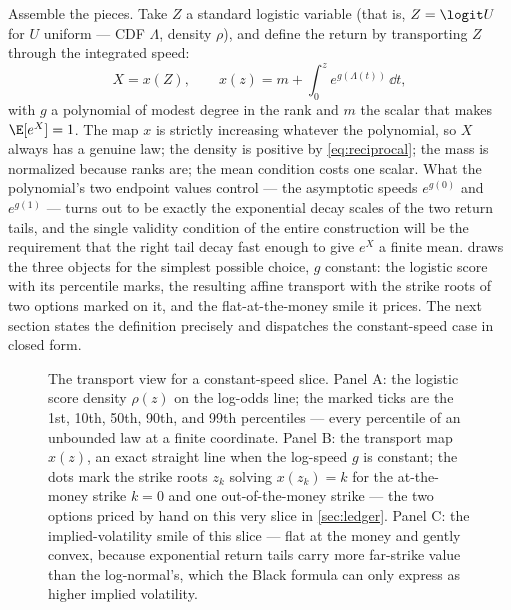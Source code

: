 Assemble the pieces.  Take $Z$ a standard logistic variable (that is,
$Z=\logit U$ for $U$ uniform --- CDF $\Lambda$, density $\rho$), and define
the return by transporting $Z$ through the integrated speed:
\begin{equation}
X=x(Z),
\qquad
x(z)=m+\int_0^{z}e^{g(\Lambda(t))}\,\dd t ,
\label{eq:transport_heur}
\end{equation}
with $g$ a polynomial of modest degree in the rank and $m$ the scalar that
makes $\E[e^{X}]=1$.  The map $x$ is strictly increasing whatever the
polynomial, so $X$ always has a genuine law; the density is positive by
\eqref{eq:reciprocal}; the mass is normalized because ranks are; the mean
condition costs one scalar.  What the polynomial's two endpoint values
control --- the asymptotic speeds $e^{g(0)}$ and $e^{g(1)}$ --- turns out
to be exactly the exponential decay scales of the two return tails, and the
single validity condition of the entire construction will be the
requirement that the right tail decay fast enough to give $e^{X}$ a finite
mean.   draws the three objects for the simplest
possible choice, $g$ constant: the logistic score with its percentile
marks, the resulting affine transport with the strike roots of two options
marked on it, and the flat-at-the-money smile it prices.  The next section
states the definition precisely and dispatches the constant-speed case in
closed form.

\begin{figure}[htbp]
\centering
{}
\caption{The transport view for a constant-speed slice.  Panel A: the
logistic score density $\rho(z)$ on the log-odds line; the marked ticks are
the 1st, 10th, 50th, 90th, and 99th percentiles --- every percentile of an
unbounded law at a finite coordinate.  Panel B: the transport map $x(z)$,
an exact straight line when the log-speed $g$ is constant; the dots mark
the strike roots $z_k$ solving $x(z_k)=k$ for the at-the-money strike
$k=0$ and one out-of-the-money strike --- the two options priced by hand
on this very slice in \cref{sec:ledger}.  Panel C: the implied-volatility smile of this slice ---
flat at the money and gently convex, because exponential return tails carry
more far-strike value than the log-normal's, which the Black formula can
only express as higher implied volatility.}
\label{fig:transport}
\end{figure}
